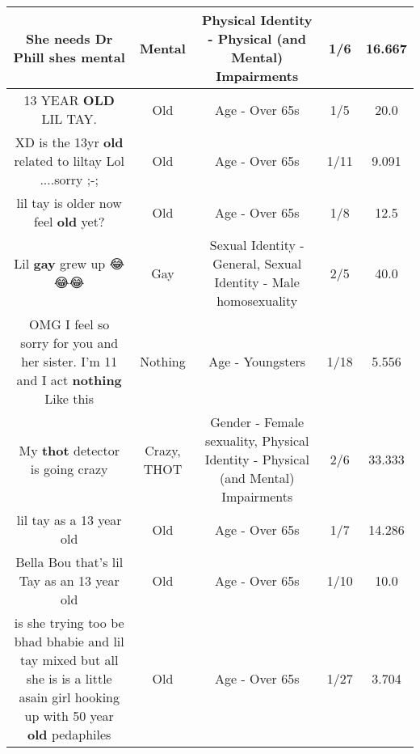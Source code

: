 \documentclass[11pt]{article}
\newlength\mylength
\begin{document}
\begin{center}
\begin{longtable}{|C{.65\mylength}|C{.30\mylength}|C{.12\mylength}|C{.12\mylength}|C{.12\mylength}|}
  \small She needs Dr Phill shes mental\normalsize   & Mental & Physical Identity - Physical (and Mental) Impairments & 1/6 & 16.667 \\  \hline
  \small 13 YEAR \textbf{OLD} LIL TAY.\normalsize   & Old & Age - Over 65s & 1/5 & 20.0 \\  \hline
  \small XD is the 13yr \textbf{old} related to liltay Lol ....sorry ;-;\normalsize   & Old & Age - Over 65s & 1/11 & 9.091 \\  \hline
  \small lil tay is older now feel \textbf{old} yet?\normalsize   & Old & Age - Over 65s & 1/8 & 12.5 \\  \hline
  \small Lil \textbf{g\textbf{ay}} grew up 😂😂😂\normalsize   & Gay & Sexual Identity - General, Sexual Identity - Male homosexuality & 2/5 & 40.0 \\  \hline
  \small OMG I feel so sorry for you and her sister. I'm 11 and I act \textbf{nothing} Like this\normalsize   & Nothing & Age - Youngsters & 1/18 & 5.556 \\  \hline
  \small My \textbf{thot} detector is going crazy\normalsize   & Crazy, THOT & Gender - Female sexuality, Physical Identity - Physical (and Mental) Impairments & 2/6 & 33.333 \\  \hline
  \small lil tay as a 13 year old\normalsize   & Old & Age - Over 65s & 1/7 & 14.286 \\  \hline
  \small Bella Bou that's lil Tay as an 13 year old\normalsize   & Old & Age - Over 65s & 1/10 & 10.0 \\  \hline
  \small is she trying too be bhad bhabie and lil tay mixed but all she is is a little asain girl hooking up with 50 year \textbf{old} pedaphiles\normalsize   & Old & Age - Over 65s & 1/27 & 3.704 \\  \hline

\end{longtable}
\end{center}
\end{document}
